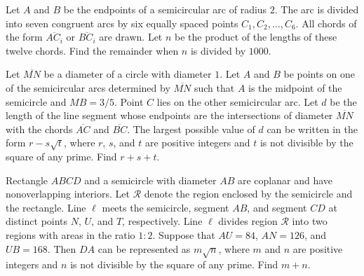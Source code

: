 \documentclass[11pt]{article}
\theoremstyle{definition}
\begin{document}
%	












\begin{question}[name={2009 AIME II, \href{https://artofproblemsolving.com/community/c4p1455385}{Problem 13}}]
	Let $ A$ and $ B$ be the endpoints of a semicircular arc of radius $ 2$. The arc is divided into seven congruent arcs by six equally spaced points $ C_1,C_2,\ldots,C_6$. All chords of the form $ \overline{AC_i}$ or $ \overline{BC_i}$ are drawn. Let $ n$ be the product of the lengths of these twelve chords. Find the remainder when $ n$ is divided by $1000$.
\end{question}


%	














\begin{question}[name={2009 AIME II, \href{https://artofproblemsolving.com/community/c4p1455383}{Problem 15}}]
	Let $ \overline{MN}$ be a diameter of a circle with diameter $ 1$. Let $ A$ and $ B$ be points on one of the semicircular arcs determined by $ \overline{MN}$ such that $ A$ is the midpoint of the semicircle and $ MB=3/5$. Point $ C$ lies on the other semicircular arc. Let $ d$ be the length of the line segment whose endpoints are the intersections of diameter $ \overline{MN}$ with the chords $ \overline{AC}$ and $ \overline{BC}$. The largest possible value of $ d$ can be written in the form $ r-s\sqrt{t}$, where $ r$, $ s$, and $ t$ are positive integers and $ t$ is not divisible by the square of any prime. Find $r+s+t$.
\end{question}








\begin{question}[name={2010 AIME I, \href{https://artofproblemsolving.com/community/c4p1813791}{Problem 13}}]
	Rectangle $ ABCD$ and a semicircle with diameter $ AB$ are coplanar and have nonoverlapping interiors. Let $ \mathcal{R}$ denote the region enclosed by the semicircle and the rectangle. Line $ \ell$ meets the semicircle, segment $ AB$, and segment $ CD$ at distinct points $ N$, $ U$, and $ T$, respectively. Line $ \ell$ divides region $ \mathcal{R}$ into two regions with areas in the ratio $ 1: 2$. Suppose that $ AU = 84$, $ AN = 126$, and $ UB = 168$. Then $ DA$ can be represented as $ m\sqrt {n}$, where $ m$ and $ n$ are positive integers and $ n$ is not divisible by the square of any prime. Find $m + n$.
\end{question}
\end{document}

